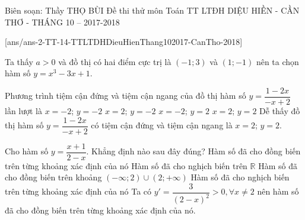 
\begin{name}
	{Biên soạn: Thầy THỌ BÙI}
	{Đề thi thử môn Toán TT LTĐH DIỆU HIỀN - CẦN THƠ - THÁNG 10 – 2017-2018}
\end{name}
\setcounter{ex}{0}\setcounter{bt}{0}

[ans/ans-2-TT-14-TTLTDHDieuHienThang102017-CanTho-2018]

\begin{ex}%
\loigiai
{Ta thấy $a>0$ và đồ thị có hai điểm cực trị là $(-1;3)$ và $(1;-1)$ nên ta chọn hàm số $y=x^3-3x+1$.}
\end{ex}

\begin{ex}%
Phương trình tiệm cận đứng và tiệm cận ngang của đồ thị hàm số $y=\dfrac{1-2x}{-x+2}$ lần lượt là
\choice
{$x=-2$; $y=-2$}
{$x=2$; $y=-2$}
{$x=-2$; $y=2$}
{\True $x=2$; $y=2$}
\loigiai
{Dễ thấy đồ thị hàm số $y=\dfrac{1-2x}{-x+2}$ có tiệm cận đứng và tiệm cận ngang là $x=2$; $y=2$.}
\end{ex}

\begin{ex}%
Cho hàm số $y=\dfrac{x+1}{2-x}$. Khẳng định nào sau đây đúng?
\choice
{\True Hàm số đã cho đồng biến trên từng khoảng xác định của nó}
{Hàm số đã cho nghịch biến trên $\mathbb{R}$}
{Hàm số đã cho đồng biến trên khoảng $(-\infty;2)\cup (2;+\infty)$}
{Hàm số đã cho nghịch biến trên từng khoảng xác định của nó}
\loigiai
{Ta có $y'=\dfrac{3}{(2-x)^2}>0, \forall x\neq 2$ nên hàm số đã cho đồng biến trên từng khoảng xác định của nó.}
\end{ex}


